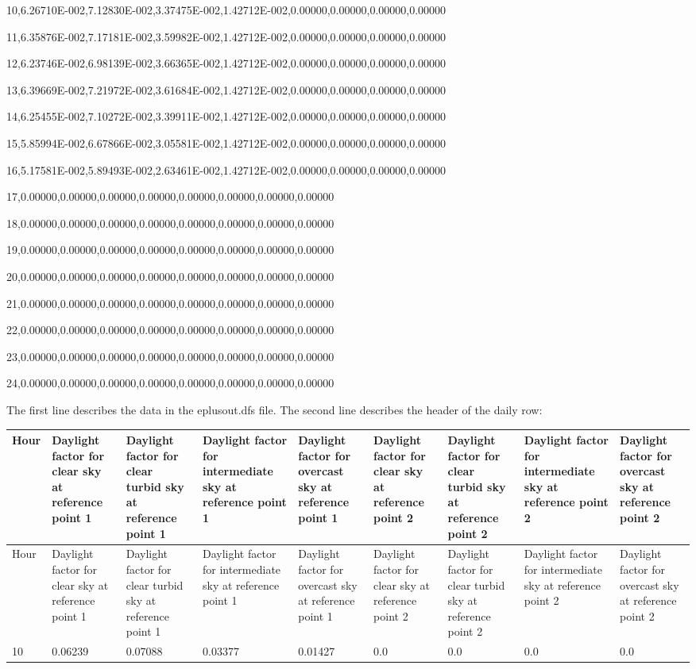 10,6.26710E-002,7.12830E-002,3.37475E-002,1.42712E-002,0.00000,0.00000,0.00000,0.00000

11,6.35876E-002,7.17181E-002,3.59982E-002,1.42712E-002,0.00000,0.00000,0.00000,0.00000

12,6.23746E-002,6.98139E-002,3.66365E-002,1.42712E-002,0.00000,0.00000,0.00000,0.00000

13,6.39669E-002,7.21972E-002,3.61684E-002,1.42712E-002,0.00000,0.00000,0.00000,0.00000

14,6.25455E-002,7.10272E-002,3.39911E-002,1.42712E-002,0.00000,0.00000,0.00000,0.00000

15,5.85994E-002,6.67866E-002,3.05581E-002,1.42712E-002,0.00000,0.00000,0.00000,0.00000

16,5.17581E-002,5.89493E-002,2.63461E-002,1.42712E-002,0.00000,0.00000,0.00000,0.00000

17,0.00000,0.00000,0.00000,0.00000,0.00000,0.00000,0.00000,0.00000

18,0.00000,0.00000,0.00000,0.00000,0.00000,0.00000,0.00000,0.00000

19,0.00000,0.00000,0.00000,0.00000,0.00000,0.00000,0.00000,0.00000

20,0.00000,0.00000,0.00000,0.00000,0.00000,0.00000,0.00000,0.00000

21,0.00000,0.00000,0.00000,0.00000,0.00000,0.00000,0.00000,0.00000

22,0.00000,0.00000,0.00000,0.00000,0.00000,0.00000,0.00000,0.00000

23,0.00000,0.00000,0.00000,0.00000,0.00000,0.00000,0.00000,0.00000

24,0.00000,0.00000,0.00000,0.00000,0.00000,0.00000,0.00000,0.00000

The first line describes the data in the eplusout.dfs file. The second line describes the header of the daily row:

\begin{longtable}[c]{p{0.66in}p{0.66in}p{0.66in}p{0.66in}p{0.66in}p{0.66in}p{0.66in}p{0.66in}p{0.66in}}
\toprule 
Hour & Daylight factor for clear sky at reference point 1 & Daylight factor for clear turbid sky at reference point 1 & Daylight factor for intermediate sky at reference point 1 & Daylight factor for overcast sky at reference point 1 & Daylight factor for clear sky at reference point 2 & Daylight factor for clear turbid sky at reference point 2 & Daylight factor for intermediate sky at reference point 2 & Daylight factor for overcast sky at reference point 2 \tabularnewline
\midrule
\endfirsthead

\toprule 
Hour & Daylight factor for clear sky at reference point 1 & Daylight factor for clear turbid sky at reference point 1 & Daylight factor for intermediate sky at reference point 1 & Daylight factor for overcast sky at reference point 1 & Daylight factor for clear sky at reference point 2 & Daylight factor for clear turbid sky at reference point 2 & Daylight factor for intermediate sky at reference point 2 & Daylight factor for overcast sky at reference point 2 \tabularnewline
\midrule
\endhead

10 & 0.06239 & 0.07088 & 0.03377 & 0.01427 & 0.0 & 0.0 & 0.0 & 0.0 \tabularnewline
\bottomrule
\end{longtable}


